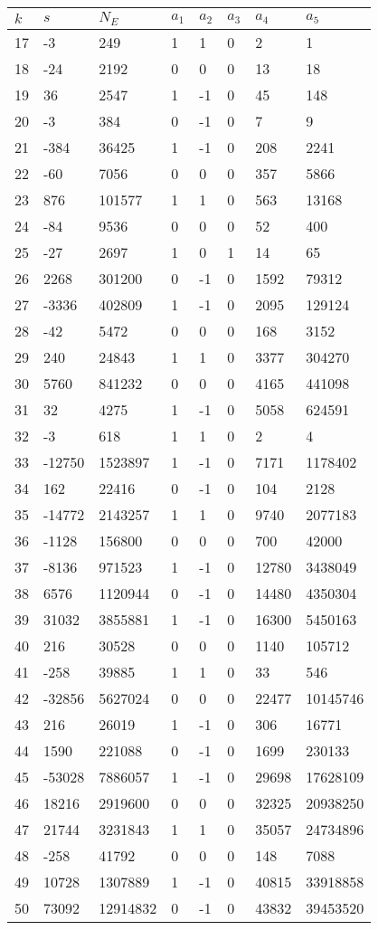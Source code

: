 \documentclass{amsart}
\begin{document}
\begin{longtable}{|l|l|l|lllll|}
\hline
$k$ & $s$ & $N_E$ & $a_1$ & $a_2$ & $a_3$ & $a_4$ & $a_5$\\
\hline
17&-3&249&1&1&0&2&1\\
18&-24&2192&0&0&0&13&18\\
19&36&2547&1&-1&0&45&148\\
20&-3&384&0&-1&0&7&9\\
21&-384&36425&1&-1&0&208&2241\\
22&-60&7056&0&0&0&357&5866\\
23&876&101577&1&1&0&563&13168\\
24&-84&9536&0&0&0&52&400\\
25&-27&2697&1&0&1&14&65\\
26&2268&301200&0&-1&0&1592&79312\\
27&-3336&402809&1&-1&0&2095&129124\\
28&-42&5472&0&0&0&168&3152\\
29&240&24843&1&1&0&3377&304270\\
30&5760&841232&0&0&0&4165&441098\\
31&32&4275&1&-1&0&5058&624591\\
32&-3&618&1&1&0&2&4\\
33&-12750&1523897&1&-1&0&7171&1178402\\
34&162&22416&0&-1&0&104&2128\\
35&-14772&2143257&1&1&0&9740&2077183\\
36&-1128&156800&0&0&0&700&42000\\
37&-8136&971523&1&-1&0&12780&3438049\\
38&6576&1120944&0&-1&0&14480&4350304\\
39&31032&3855881&1&-1&0&16300&5450163\\
40&216&30528&0&0&0&1140&105712\\
41&-258&39885&1&1&0&33&546\\
42&-32856&5627024&0&0&0&22477&10145746\\
43&216&26019&1&-1&0&306&16771\\
44&1590&221088&0&-1&0&1699&230133\\
45&-53028&7886057&1&-1&0&29698&17628109\\
46&18216&2919600&0&0&0&32325&20938250\\
47&21744&3231843&1&1&0&35057&24734896\\
48&-258&41792&0&0&0&148&7088\\
49&10728&1307889&1&-1&0&40815&33918858\\
50&73092&12914832&0&-1&0&43832&39453520\\
\hline
\end{longtable}
\end{document}
